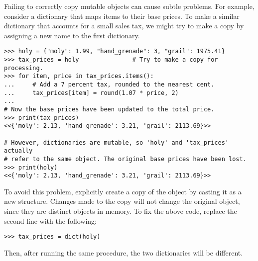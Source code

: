 \begin{warn} %
Failing to correctly copy mutable objects can cause subtle problems.
For example, consider a dictionary that maps items to their base prices.
To make a similar dictionary that accounts for a small sales tax, we might try to make a copy by assigning a new name to the first dictionary.

\begin{lstlisting}
>>> holy = {"moly": 1.99, "hand_grenade": 3, "grail": 1975.41}
>>> tax_prices = holy               # Try to make a copy for processing.
>>> for item, price in tax_prices.items():
...     # Add a 7 percent tax, rounded to the nearest cent.
...     tax_prices[item] = round(1.07 * price, 2)
...
# Now the base prices have been updated to the total price.
>>> print(tax_prices)
<<{'moly': 2.13, 'hand_grenade': 3.21, 'grail': 2113.69}>>

# However, dictionaries are mutable, so 'holy' and 'tax_prices' actually
# refer to the same object. The original base prices have been lost.
>>> print(holy)
<<{'moly': 2.13, 'hand_grenade': 3.21, 'grail': 2113.69}>>
\end{lstlisting}

To avoid this problem, explicitly create a copy of the object by casting it as a new structure.
Changes made to the copy will not change the original object, since they are distinct objects in memory.
To fix the above code, replace the second line with the following:

\begin{lstlisting}
>>> tax_prices = dict(holy)
\end{lstlisting}
Then, after running the same procedure, the two dictionaries will be different.

\end{warn}


